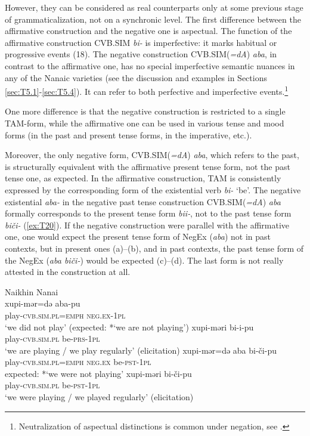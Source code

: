 \documentclass[output=paper]{langscibook}
\begin{document}
However, they can be considered as real counterparts only at some previous stage of grammaticalization, not on a synchronic level. The first difference between the affirmative construction and the negative one is aspectual. The function of the affirmative construction CVB.SIM \textit{bi-} is imperfective: it marks habitual or progressive events (18). The negative construction CVB.SIM(\textit{=dA}) \textit{aba}, in contrast to the affirmative one, has no special imperfective semantic nuances in any of the Nanaic varieties (see the discussion and examples in Sections \ref{sec:T5.1}-\ref{sec:T5.4}). It can refer to both perfective and imperfective events.\footnote{Neutralization of aspectual distinctions is common under negation, see \citet{Miestamo2005}.}

One more difference is that the negative construction is restricted to a single TAM-form, while the affirmative one can be used in various tense and mood forms (in the past and present tense forms, in the imperative, etc.).

Moreover, the only negative form, CVB.SIM(\textit{=dA}) \textit{aba}, which refers to the past, is structurally equivalent with the affirmative present tense form, not the past tense one, as expected. In the affirmative construction, TAM is consistently expressed by the corresponding form of the existential verb \textit{bi-} ‘be’. The negative existential \textit{aba-} in the negative past tense construction CVB.SIM(\textit{=dA}) \textit{aba} formally corresponds to the present tense form \textit{bii‑}, not to the past tense form \textit{biči-} (\ref{ex:T20}). If the negative construction were parallel with the affirmative one, one would expect the present tense form of NegEx (\textit{aba}) not in past contexts, but in present ones (a)–(b), and in past contexts, the past tense form of the NegEx (\textit{aba biči-}) would be expected (c)–(d). The last form is not really attested in the construction at all.

\ea Naikhin Nanai \label{ex:T21}\\
  \ea
	\gll xupi-mər=də	aba-pu {}\\
	play-\textsc{cvb.sim.pl=emph}	\textsc{neg.ex-1pl}	~	\\
	\glt `we did not play' (expected: *`we are not playing')
  \ex
	\gll xupi-məri			bi-i-pu\\
	play-\textsc{cvb.sim.pl}	be-\textsc{prs-1pl}\\
    \glt `we are playing / we play regularly' (elicitation)
  \ex
	\gll *xupi-mər=də	aba		bi-či-pu\\
	play-\textsc{cvb.sim.pl=emph}	\textsc{neg.ex}		be-\textsc{pst-1pl}\\
    \glt expected: *`we were not playing'
  \ex
	\gll xupi-məri			bi-či-pu\\
	play-\textsc{cvb.sim.pl}	be-\textsc{pst-1pl}\\
	\glt `we were playing / we played regularly' (elicitation)
\z \z
\end{document}

